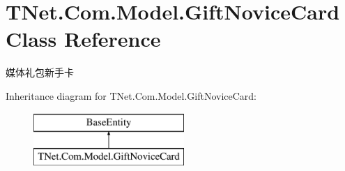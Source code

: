 \hypertarget{class_t_net_1_1_com_1_1_model_1_1_gift_novice_card}{}\section{T\+Net.\+Com.\+Model.\+Gift\+Novice\+Card Class Reference}
\label{class_t_net_1_1_com_1_1_model_1_1_gift_novice_card}


媒体礼包新手卡  


Inheritance diagram for T\+Net.\+Com.\+Model.\+Gift\+Novice\+Card\+:\begin{figure}[H]
\begin{center}
\leavevmode
\includegraphics[height=2.000000cm]{class_t_net_1_1_com_1_1_model_1_1_gift_novice_card}
\end{center}
\end{figure}
